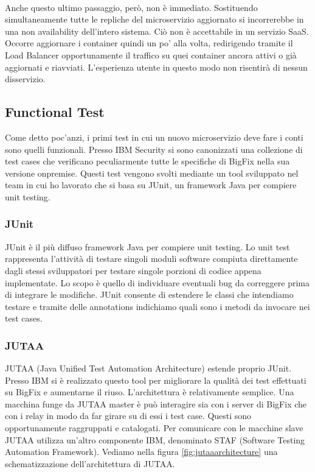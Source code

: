 \paragraph{}
Anche questo ultimo passaggio, però, non è immediato. Sostituendo simultaneamente tutte le repliche del microservizio aggiornato si incorrerebbe in una non availability dell'intero sistema. Ciò non è accettabile in un servizio SaaS. Occorre aggiornare i container quindi un po' alla volta, redirigendo tramite il Load Balancer opportunamente il traffico su quei container ancora attivi o già aggiornati e riavviati. L'esperienza utente in questo modo non risentirà di nessun disservizio.
\subsection{Functional Test}
Come detto poc'anzi, i primi test in cui un nuovo microservizio deve fare i conti sono quelli funzionali. Presso IBM Security si sono canonizzati una collezione di test cases che verificano peculiarmente tutte le specifiche di BigFix nella sua versione onpremise. Questi test vengono svolti mediante un tool sviluppato nel team in cui ho lavorato che si basa su JUnit, un framework Java per compiere unit testing.
\subsubsection{JUnit}
JUnit è il più diffuso framework Java per compiere unit testing. Lo unit test rappresenta l'attività di testare singoli moduli software compiuta direttamente dagli stessi sviluppatori per testare singole porzioni di codice appena implementate. Lo scopo è quello di individuare eventuali bug da correggere prima di integrare le modifiche. JUnit consente di estendere le classi che intendiamo testare e tramite delle annotations indichiamo quali sono i metodi da invocare nei test cases.
\subsubsection{JUTAA}
JUTAA (Java Unified Test Automation Architecture) estende proprio JUnit. Presso IBM si è realizzato questo tool per migliorare la qualità dei test effettuati su BigFix e aumentarne il riuso. L'architettura è relativamente semplice. Una macchina funge da JUTAA master è può interagire sia con i server di BigFix che con i relay in modo da far girare su di essi i test case. Questi sono opportunamente raggruppati e catalogati. Per comunicare con le macchine slave JUTAA utilizza un'altro componente IBM, denominato STAF (Software Testing Automation Framework). Vediamo nella figura \ref{fig:jutaaarchitecture} una schematizzazione dell'architettura di JUTAA.

